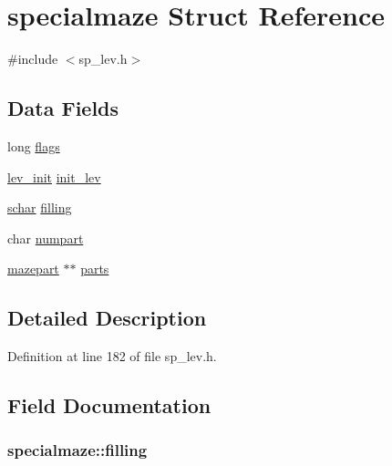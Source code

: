\hypertarget{structspecialmaze}{\section{specialmaze Struct Reference}
\label{structspecialmaze}
}


{\ttfamily \#include $<$sp\+\_\+lev.\+h$>$}

\subsection*{Data Fields}
\begin{DoxyCompactItemize}
\item 
long \hyperlink{structspecialmaze_a787acf0a4703a5f4eba92135c1776409}{flags}
\item 
\hyperlink{structlev__init}{lev\+\_\+init} \hyperlink{structspecialmaze_af54101363dfb2b1e3df12c943c23dbf4}{init\+\_\+lev}
\item 
\hyperlink{config_8h_a0fd9ce9d735064461bebfe6037026093}{schar} \hyperlink{structspecialmaze_aa3e5e9b7b52a57722a508989b11ad87b}{filling}
\item 
char \hyperlink{structspecialmaze_ad827b69cc4db02d75e0336da1aa8ea0e}{numpart}
\item 
\hyperlink{structmazepart}{mazepart} $\ast$$\ast$ \hyperlink{structspecialmaze_a28db847d2018fa5841c388b1be2da4e5}{parts}
\end{DoxyCompactItemize}


\subsection{Detailed Description}


Definition at line 182 of file sp\+\_\+lev.\+h.



\subsection{Field Documentation}
\hypertarget{structspecialmaze_aa3e5e9b7b52a57722a508989b11ad87b}{
\subsubsection[{filling}]{ specialmaze\+::filling}}\label{structspecialmaze_aa3e5e9b7b52a57722a508989b11ad87b}


